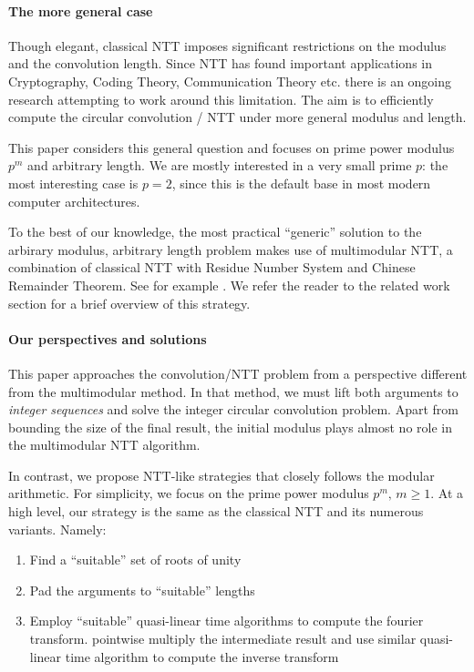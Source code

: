 \paragraph{The more general case}
Though elegant, classical NTT imposes significant restrictions on the modulus and the convolution length. Since NTT has found important applications in Cryptography, Coding Theory, Communication Theory etc. there is an ongoing research attempting to work around this limitation. The aim is to efficiently compute the circular convolution / NTT under more general modulus and length.

This paper considers this general question and focuses on prime power modulus \(p^m\) and arbitrary length. We are mostly interested in a very small prime \(p\): the most interesting case is \(p = 2\), since this is the default base in most modern computer architectures.

To the best of our knowledge, the most practical ``generic'' solution to the arbirary modulus, arbitrary length problem makes use of multimodular NTT, a combination of classical NTT with Residue Number System and Chinese Remainder Theorem. See for example . We refer the reader to the related work section for a brief overview of this strategy.

\paragraph{Our perspectives and solutions}
This paper approaches the convolution/NTT problem from a perspective different from the multimodular method. In that method, we must lift both arguments to \emph{integer sequences} and solve the integer circular convolution problem. Apart from bounding the size of the final result, the initial modulus plays almost no role in the multimodular NTT algorithm.

In contrast, we propose NTT-like strategies that closely follows the modular arithmetic. For simplicity, we focus on the prime power modulus \(p^m,\, m \ge 1\). At a high level, our strategy is the same as the classical NTT and its numerous variants. Namely:
\begin{enumerate}
    \item Find a ``suitable'' set of roots of unity
    \item Pad the arguments to ``suitable'' lengths
    \item Employ ``suitable'' quasi-linear time algorithms to compute the fourier transform. pointwise multiply the intermediate result and use similar quasi-linear time algorithm to compute the inverse transform
\end{enumerate}

